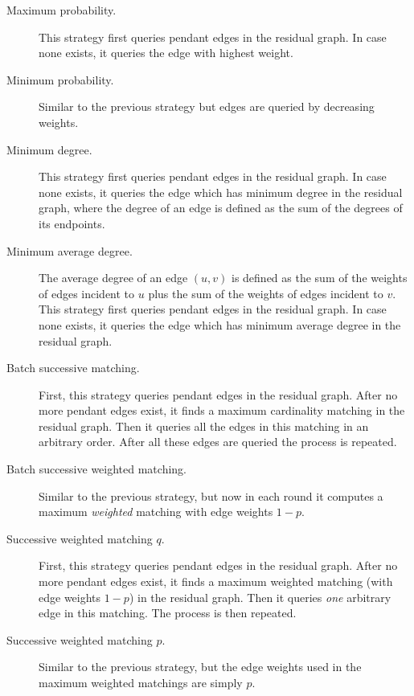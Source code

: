 \documentclass[12pt]{article}
\begin{document}
		\begin{description}
			\item[Maximum probability.] This strategy first queries pendant edges in the residual graph. In case none exists, it queries the edge with highest weight. 
			
			\item[Minimum probability.] Similar to the previous strategy but edges are queried by decreasing weights.
			
			\item[Minimum degree.] This strategy first queries pendant edges in the residual graph. In case none exists, it queries the edge which has minimum degree in the residual graph, where the degree of an edge is defined as the sum of the degrees of its endpoints.
			
			\item[Minimum average degree.] The average degree of an edge $(u,v)$ is defined as the sum of the weights of edges incident to $u$ plus the sum of the weights of edges incident to $v$. This strategy first queries pendant edges in the residual graph. In case none exists, it queries the edge which has minimum average degree in the residual graph.  
			
			\item[Batch successive matching.] First, this strategy queries pendant edges in the residual graph. After no more pendant edges exist, it finds a maximum cardinality matching in the residual graph. Then it queries all the edges in this matching in an arbitrary order. After all these edges are queried the process is repeated.
			
			\item[Batch successive weighted matching.] Similar to the previous strategy, but now in each round it computes a maximum \emph{weighted} matching with edge weights $1 - p$. 
			
			\item[Successive weighted matching $q$.] First, this strategy queries pendant edges in the residual graph. After no more pendant edges exist, it finds a maximum weighted matching (with edge weights $1 - p$) in the residual graph. Then it queries \emph{one} arbitrary edge in this matching. The process is then repeated.
			
			\item[Successive weighted matching $p$.] Similar to the previous strategy, but the edge weights used in the maximum weighted matchings are simply $p$.
	\end{description}
	
\end{document}
